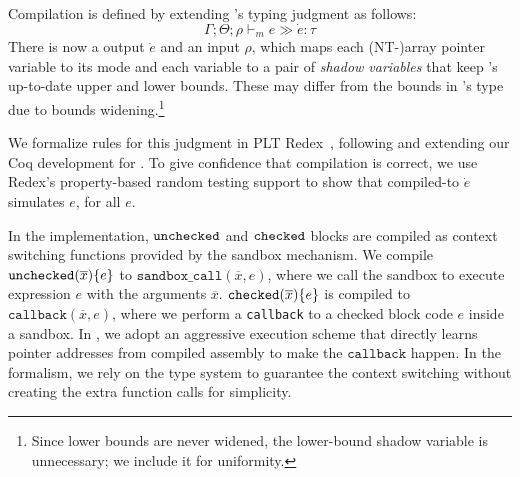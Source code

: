 {Compilation is defined by extending \lang's
typing judgment as follows:
\[\Gamma;\Theta;\rho \vdash_m e \gg \dot e:\tau\]
There is now a \elang output $\dot e$ and an input $\rho$, which maps
each (NT-)array pointer variable to its mode and
each variable  to a pair of \emph{shadow
  variables} that keep 's up-to-date upper and lower bounds. 
These may differ from the bounds in 's type due to bounds
widening.\footnote{Since lower bounds are never widened, the
  lower-bound shadow variable is unnecessary; we include it for uniformity.} 


We formalize rules for this judgment in PLT Redex~\cite{pltredex},
following and extending our Coq development for \lang. To give
confidence that compilation is correct, we use Redex's property-based
random testing support to show that compiled-to $\dot e $ simulates
$e$, for all $e$.

%
In the \systemname implementation,
$\mathtt{unchecked}$ and $\mathtt{checked}$ blocks 
are compiled as context switching functions provided by the sandbox mechanism.
We compile $\mathtt{unchecked}({\overline{x}})\{e\}$ to 
$\texttt{sandbox\_call}(\overline{x},e)$, where we call the sandbox 
to execute expression $e$ with the arguments $\overline{x}$.
$\mathtt{checked}({\overline{x}}){\{e\}}$ is compiled to 
$\texttt{callback}(\overline{x},e)$, where we perform 
a \texttt{callback} to a checked block code $e$ inside a sandbox.
In \systemname, we adopt an aggressive execution scheme that
directly learns pointer addresses from compiled assembly to make the $\texttt{callback}$ happen.
In the formalism, we rely on the type system to 
guarantee the context switching without creating the extra function calls for simplicity.


}

